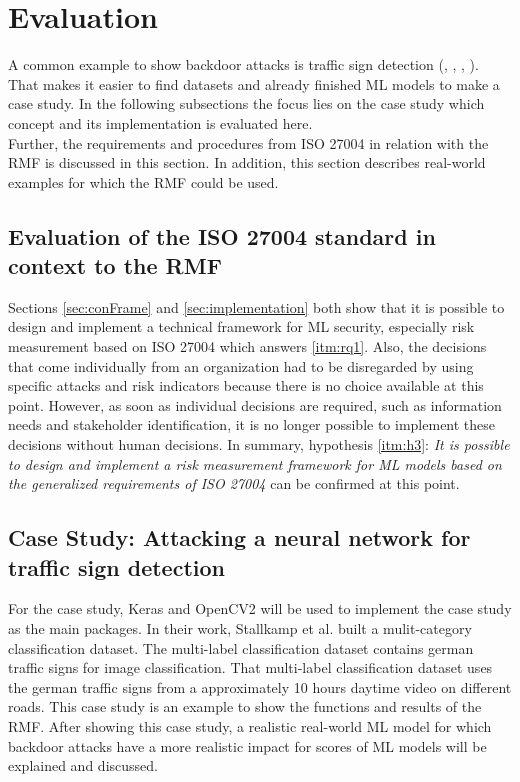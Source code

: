 \section{Evaluation}
\label{sec:evaluation}

A common example to show backdoor attacks is traffic sign detection (\cite{DBLP:journals/corr/abs-2102-10369}, \cite{DBLP:journals/corr/abs-1708-06733}, \cite{DBLP:conf/codaspy/NudingM20},
\cite{DBLP:journals/tdsc/LiXZZZ21}). That makes it easier to find datasets and already finished ML models to make a case study. In the following subsections the focus lies on the case study which concept and its implementation is evaluated here. \\ Further, the requirements and procedures from ISO 27004 in relation with the RMF is discussed in this section. In addition, this section describes real-world examples for which the RMF could be used.

\subsection{Evaluation of the ISO 27004 standard in context to the RMF}

Sections \ref{sec:conFrame} and \ref{sec:implementation} both show that it is possible to design and implement a technical framework for ML security, especially risk measurement based on ISO 27004 \cite{ISO_27004_2009} which answers \ref{itm:rq1}. Also, the decisions that come individually from an organization had to be disregarded by using specific attacks and risk indicators because there is no choice available at this point. However, as soon as individual decisions are required, such as information needs and stakeholder identification, it is no longer possible to implement these decisions without human decisions. In summary, hypothesis \ref{itm:h3}: \textit{It is possible to design and implement a risk measurement framework for ML models based on the generalized requirements of ISO 27004} can be confirmed at this point.

\subsection{Case Study: Attacking a neural network for traffic sign detection}

For the case study, Keras \cite{DBLP:journals/corr/abs-2006-12138} and OpenCV2 will be used to implement the case study \cite{opencv_library} as the main packages. In their work, Stallkamp et al. \cite{DBLP:conf/ijcnn/StallkampSSI11} built a mulit-category classification dataset. The multi-label classification dataset contains german traffic signs for image classification. That multi-label classification dataset uses the german traffic signs from a approximately 10 hours daytime video on different roads.
This case study is an example to show the functions and results of the RMF. After showing this case study, a realistic real-world ML model for which backdoor attacks have a more realistic impact for scores of ML models will be explained and discussed.


